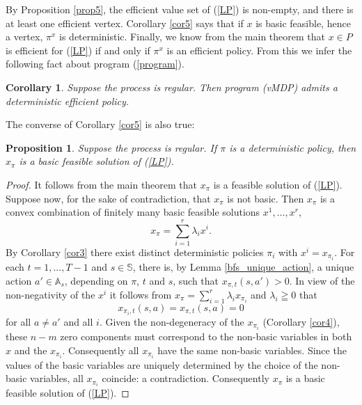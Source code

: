 \documentclass{article}
\newtheorem{corollary}[theorem]{Corollary}
\newtheorem{proposition}[theorem]{Proposition}
\theoremstyle{definition}
\numberwithin{equation}{section}
\begin{document}
By Proposition \ref{prop5},  the efficient value set of (\ref{LP}) is non-empty, and
there is at least one efficient vertex. 
Corollary \ref{cor5} says that if $x$ is basic feasible, hence a vertex, $\pi^x$ is deterministic. Finally, we know from the main theorem that 
$x \in P$ is efficient for (\ref{LP}) if and only if $\pi^x$ is an efficient policy. 
From this we infer the following fact about program (\ref{program}).



\begin{corollary}
\label{cor6}
Suppose the process is regular. Then program {\rm (vMDP)} %
admits a deterministic efficient policy. 
\end{corollary}

The converse of Corollary \ref{cor5} is also true:

\begin{proposition} 
\label{prop4}
Suppose the process is regular.
If $\pi$ is a deterministic policy, then $x_{\pi}$ is a basic feasible solution of {\rm (\ref{LP})}.
\end{proposition}



\begin{proof}
It follows from the main theorem that
$x_\pi$ is a feasible solution of (\ref{LP}). 
Suppose now, for the sake of contradiction, that $x_{\pi}$ is not basic. Then $x_{\pi}$ is a convex combination of 
finitely many basic feasible solutions $x^1,\dots,x^r$,
$$
x_\pi = \sum_{i=1}^r \lambda_i x^i.
$$
By Corollary \ref{cor3} there exist distinct deterministic policies
$\pi_i$ with $x^i = x_{\pi_i}$. For each $t = 1, ..., T-1$ and $s \in \mathbb{S}$, there is, by Lemma \ref{bfs_unique_action}, a unique action $a' \in \mathbb{A}_s$, depending on $\pi$, $t$ and $s$,  such that $x_{\pi, t}(s, a') > 0$. In view of the non-negativity of 
the $x^i$  it follows from $x_{\pi} = \sum_{i=1}^r\lambda_i x_{\pi_i}$ and $\lambda_i \geqq 0$ that 
\begin{equation*}x_{\pi_i, t}(s, a) =  x_{\pi, t}(s, a) = 0\end{equation*} 
for all $a \neq a'$ and all $i$. Given the non-degeneracy of the $x_{\pi_i}$ (Corollary \ref{cor4}), these $n-m$ zero components must correspond to the non-basic variables in both $x$ and the $x_{\pi_i}$. Consequently all $x_{\pi_i}$ have the same non-basic variables. Since the values of the basic variables are uniquely determined by the choice of the non-basic variables, all $x_{\pi_i}$ coincide: a contradiction. Consequently $x_{\pi}$ is a basic feasible solution of (\ref{LP}).  
\end{proof}
\end{document}
